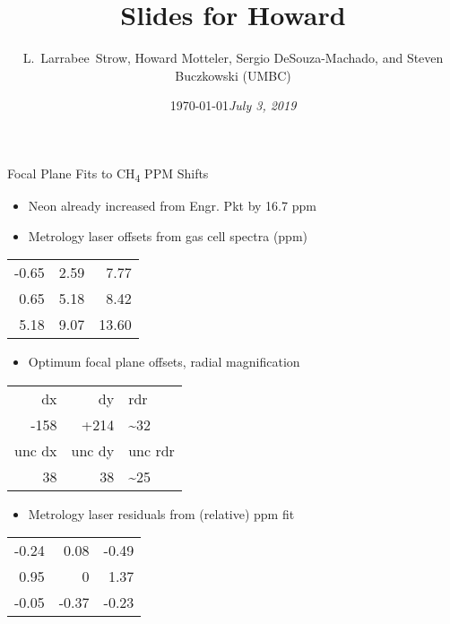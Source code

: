 \documentclass[10pt,t]{beamer}
\date{\today}
\title{Slides for Howard}
\date{\textit{\footnotesize July 3, 2019}}
\author{L.~Larrabee~Strow, Howard Motteler, Sergio DeSouza-Machado, and Steven Buczkowski (UMBC)}
\begin{document}
\maketitle

\begin{frame}[label={sec:orgdc40122}]{Focal Plane Fits to CH\textsubscript{4} PPM Shifts}
\begin{small}

\begin{itemize}
\item Neon already increased from Engr. Pkt by 16.7 ppm

\item Metrology laser offsets from gas cell spectra (ppm)
\end{itemize}
\begin{center}
\begin{tabular}{rrr}
-0.65 & 2.59 & 7.77\\
0.65 & 5.18 & 8.42\\
5.18 & 9.07 & 13.60\\
\end{tabular}
\end{center}

\begin{itemize}
\item Optimum focal plane offsets, radial magnification
\end{itemize}
\begin{center}
\begin{tabular}{rrl}
dx & dy & rdr\\
-158 & +214 & \textasciitilde{}32\\
\hline
unc   dx & unc   dy & unc rdr\\
38 & 38 & \textasciitilde{}25\\
\end{tabular}
\end{center}

\begin{itemize}
\item Metrology laser residuals from (relative) ppm fit
\end{itemize}
\begin{center}
\begin{tabular}{rrr}
-0.24 & 0.08 & -0.49\\
0.95 & 0 & 1.37\\
-0.05 & -0.37 & -0.23\\
\end{tabular}
\end{center}
\end{small}
\end{frame}
\end{document}
